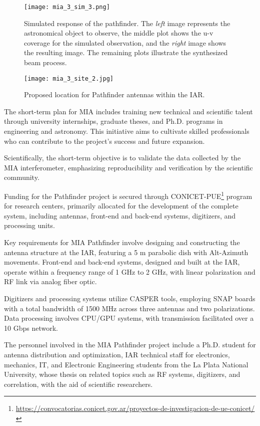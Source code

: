 \documentclass[baaa]{baaa}
\begin{document}
\begin{figure}[!t]
  \centering
  \texttt{[image: mia\_3\_sim\_3.png]}
  \caption{{Simulated response of the pathfinder. The \emph{left} image represents the astronomical object to observe, the middle plot shows the u-v coverage for the simulated observation, and the \emph{right} image shows the resulting image. The remaining plots illustrate the synthesized beam process.}}
  \label{fig:mia3sim}
\end{figure}

\begin{figure}[!t]
  \texttt{[image: mia\_3\_site\_2.jpg]}
  \caption{{Proposed location for Pathfinder antennas within the IAR.}}
  \label{fig:mia3site}
\end{figure}


The short-term plan for MIA includes training new technical and scientific talent through university internships, graduate theses, and Ph.D. programs in engineering and astronomy. This initiative aims to cultivate skilled professionals who can contribute to the project's success and future expansion.

Scientifically, the short-term objective is to validate the data collected by the MIA interferometer, emphasizing reproducibility and verification by the scientific community.

Funding for the Pathfinder project is secured through CONICET-PUE\footnote{\url{https://convocatorias.conicet.gov.ar/proyectos-de-investigacion-de-ue-conicet/}} program for research centers, primarily allocated for the development of the complete system, including antennas, front-end and back-end systems, digitizers, and processing units.

Key requirements for MIA Pathfinder involve designing and constructing the antenna structure at the IAR, featuring a 5 m parabolic dish with Alt-Azimuth movements. Front-end and back-end systems, designed and built at the IAR, operate within a frequency range of 1 GHz to 2 GHz, with linear polarization and RF link via analog fiber optic.

Digitizers and processing systems utilize CASPER tools, employing SNAP boards with a total bandwidth of 1500 MHz across three antennas and two polarizations. Data processing involves CPU/GPU systems, with transmission facilitated over a 10 Gbps network.

The personnel involved in the MIA Pathfinder project include a Ph.D. student for antenna distribution and optimization, IAR technical staff for electronics, mechanics, IT, and Electronic Engineering students from the La Plata National University, whose thesis on related topics such as RF systems, digitizers, and correlation, with the aid of scientific researchers.
\end{document}
